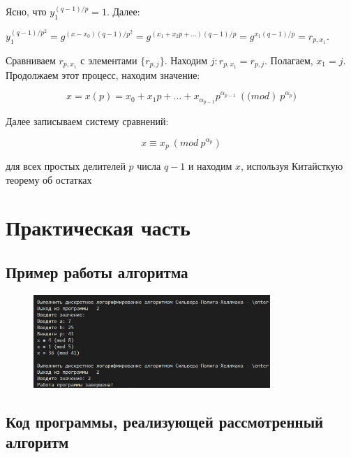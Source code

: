 \documentclass[bachelor, och, labwork]{shiza}
\begin{document}
Ясно, что $y_1^{(q-1)/p}= 1$. Далее:

\begin{center}
    $y_1^{(q-1)/p^2}=g^{(x-x_0)(q-1)/p^2}=g^{(x_1+x_2p+...)(q-1)/p} = g^{x_1(q-1)/p} = r_{p,x_1}$.
\end{center}

Сравниваем $r_{p,x_1}$ с элементами $\{r_{p,j}\}$. Находим $j:r_{p,x_1}=r_{p,j}$.
Полагаем, $x_1=j$. Продолжаем этот процесс, находим значение:


$$x=x(p)=x_0+x_1p+...+x_{\alpha_{p-1}}p^{\alpha_{p-1}}~(\mathit(mod)~p^{\alpha_p})$$

Далее записываем систему сравнений:

$$x \equiv x_p ~(\mathit{mod} ~p^{\alpha_p})$$

для всех простых делителей $p$ числа $q-1$ и находим $x$, используя Китайсткую
теорему об остатках


\section{Практическая часть}

\nopagebreak

\subsection{Пример работы алгоритма}
\begin{figure}[H]
    \centering
    \includegraphics[width=0.8\textwidth]{pic.png}
    \caption{}
\end{figure}


    \subsection{Код программы, реализующей рассмотренный алгоритм}
        \inputminted{python}{lab2.py}
\end{document}
